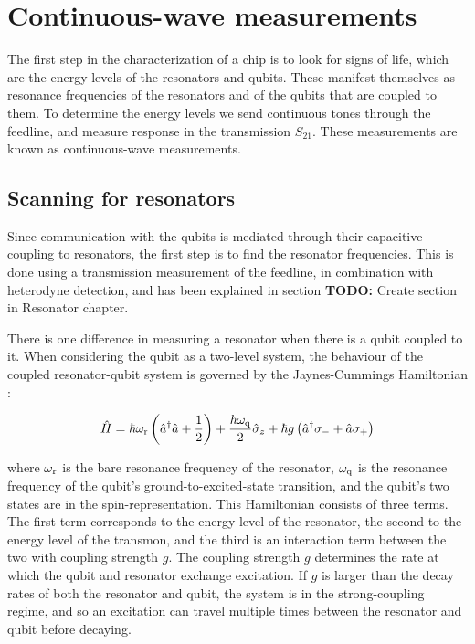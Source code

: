     \section{Continuous-wave measurements}

      The first step in the characterization of a chip is to look for signs of life, which are the energy levels of the resonators and qubits. These manifest themselves as resonance frequencies of the resonators and of the qubits that are coupled to them. To determine the energy levels we send continuous tones through the feedline, and measure response in the transmission $S_{21}$. These measurements are known as continuous-wave measurements.

      \subsection{Scanning for resonators}
        \label{sec:resonator-scan}
        Since communication with the qubits is mediated through their capacitive coupling to resonators, the first step is to find the resonator frequencies. This is done using a transmission measurement of the feedline, in combination with heterodyne detection, and has been explained in section \textbf{TODO:} Create section in Resonator chapter.

        There is one difference in measuring a resonator when there is a qubit coupled to it. When considering the qubit as a two-level system, the behaviour of the coupled resonator-qubit system is governed by the Jaynes-Cummings Hamiltonian \cite{koch2007Transmon}:

        \begin{equation}
          \hat{H} = \hbar \omega_\text{r}\left(\hat{a}^\dagger \hat{a} + \frac{1}{2} \right) + \frac{\hbar \omega_\text{q}}{2}\hat{\sigma}_z + \hbar g \left(\hat{a}^\dagger \sigma_{-} + \hat{a}\sigma_{+}\right)
          \label{eq:Jaynes-Cummings}
        \end{equation}

        where $\omega_\text{r}$ is the bare resonance frequency of the resonator, $\omega_\text{q}$ is the resonance frequency of the qubit's ground-to-excited-state transition, and the qubit's two states are in the spin-representation. This Hamiltonian consists of three terms. The first term corresponds to the energy level of the resonator, the second to the energy level of the transmon, and the third is an interaction term between the two with coupling strength $g$. The coupling strength $g$ determines the rate at which the qubit and resonator exchange excitation. If $g$ is larger than the decay rates of both the resonator and qubit, the system is in the strong-coupling regime, and so an excitation can travel multiple times between the resonator and qubit before decaying.


